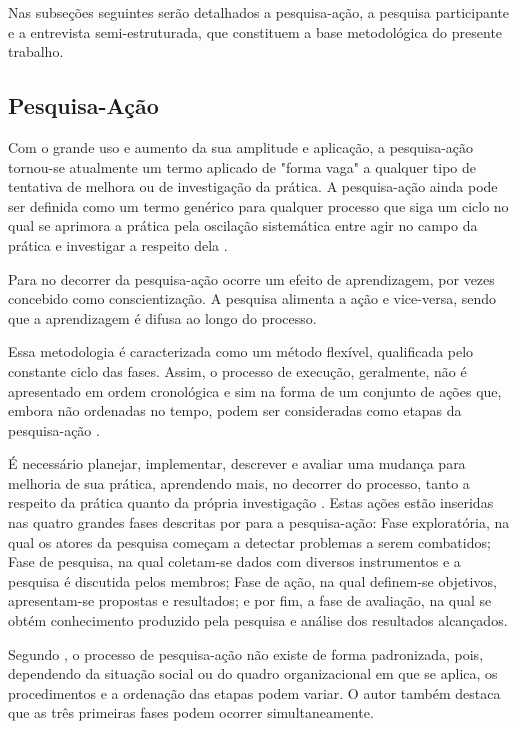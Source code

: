 Nas subseções seguintes serão detalhados a pesquisa-ação, a pesquisa participante e a entrevista semi-estruturada, que constituem a base metodológica do presente trabalho.

\subsection{Pesquisa-Ação}

Com o grande uso e aumento da sua amplitude e aplicação, a pesquisa-ação tornou-se atualmente um termo aplicado de "forma vaga" a qualquer tipo de tentativa de melhora ou de investigação da prática. A pesquisa-ação ainda pode ser definida como um termo genérico para qualquer processo que siga um ciclo no qual se aprimora a prática pela oscilação sistemática entre agir no campo da prática e investigar a respeito dela \cite{tripp2005pesquisa}.

Para  no decorrer da pesquisa-ação ocorre um efeito de aprendizagem, por vezes concebido como conscientização. A pesquisa alimenta a ação e vice-versa, sendo que a aprendizagem é difusa ao longo do processo.

Essa metodologia é caracterizada como um método flexível, qualificada pelo constante ciclo das fases. Assim, o processo de execução, geralmente, não é apresentado em ordem cronológica e sim na forma de um conjunto de ações que, embora não ordenadas no tempo, podem ser consideradas como etapas da pesquisa-ação \cite{gil2002,thiollent2011metodologia}.

É necessário planejar, implementar, descrever e avaliar uma mudança para melhoria de sua prática, aprendendo mais, no decorrer do processo, tanto a respeito da prática quanto da própria investigação \cite{tripp2005pesquisa}. Estas ações estão inseridas nas quatro grandes fases descritas por  para a pesquisa-ação: Fase exploratória, na qual os atores da pesquisa começam a detectar problemas a serem combatidos; Fase de pesquisa, na qual coletam-se dados com diversos instrumentos e a pesquisa é discutida pelos membros; Fase de ação, na qual definem-se objetivos, apresentam-se propostas e resultados; e por fim, a fase de avaliação, na qual se obtém conhecimento produzido pela pesquisa e análise dos resultados alcançados.

Segundo , o processo de pesquisa-ação não existe de forma padronizada, pois, dependendo da situação social ou do quadro organizacional em que se aplica, os procedimentos e a ordenação das etapas podem variar. O autor também destaca que as três primeiras fases podem ocorrer simultaneamente.

